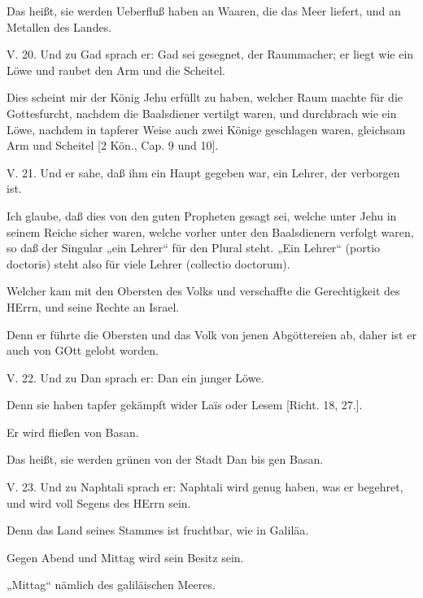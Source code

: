 Das heißt, sie werden Ueberfluß haben an Waaren, die das Meer liefert, und an Metallen des Landes.

\begin{schriftzitat}
V. 20. Und zu Gad sprach er: Gad sei gesegnet, der Raummacher; er liegt wie ein Löwe und raubet den Arm und die Scheitel.
\end{schriftzitat}

Dies scheint mir der König Jehu erfüllt zu haben, welcher Raum machte für die Gottesfurcht, nachdem die Baalsdiener vertilgt waren, und durchbrach wie ein Löwe, nachdem in tapferer Weise auch zwei Könige geschlagen waren, gleichsam Arm und Scheitel [2 Kön., Cap. 9 und 10].

\begin{schriftzitat}
V. 21. Und er sahe, daß ihm ein Haupt gegeben war, ein Lehrer, der verborgen ist.
\end{schriftzitat}

Ich glaube, daß dies von den guten Propheten gesagt sei, welche unter Jehu in seinem Reiche sicher waren, welche vorher unter den Baalsdienern verfolgt waren, so daß der Singular „ein Lehrer“ für den Plural steht. „Ein Lehrer“ (portio doctoris) steht also für viele Lehrer (collectio doctorum).

Welcher kam mit den Obersten des Volks und verschaffte die Gerechtigkeit des HErrn, und seine Rechte an Israel.

Denn er führte die Obersten und das Volk von jenen Abgöttereien ab, daher ist er auch von GOtt gelobt worden.

\begin{schriftzitat}
V. 22. Und zu Dan sprach er: Dan ein junger Löwe.
\end{schriftzitat}

Denn sie haben tapfer gekämpft wider Laïs oder Lesem [Richt. 18, 27.].

Er wird fließen von Basan.

Das heißt, sie werden grünen von der Stadt Dan bis gen Basan.

\begin{schriftzitat}
V. 23. Und zu Naphtali sprach er: Naphtali wird genug haben, was er begehret, und wird voll Segens des HErrn sein.
\end{schriftzitat}

Denn das Land seines Stammes ist fruchtbar, wie in Galiläa.

Gegen Abend und Mittag wird sein Besitz sein.

„Mittag“ nämlich des galiläischen Meeres.

